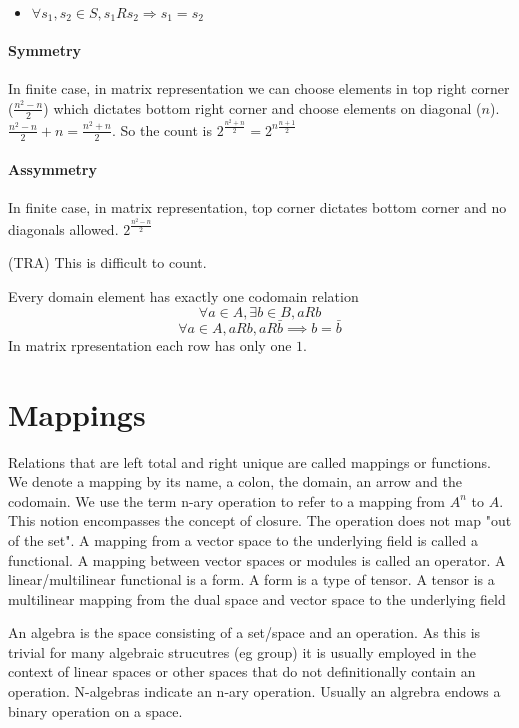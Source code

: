 \documentclass[a4paper]{scrartcl}
\begin{document}
\begin{itemize}
\item{$\forall s_{1},s_{2}\in S, s_{1}Rs_{2} \Rightarrow s_{1} = s_{2}$}

\end{itemize}


\paragraph{Symmetry} In finite case, in matrix representation we can choose elements in top right corner ($\frac{n^2 - n}{2}$) which dictates bottom right corner and choose elements on diagonal ($n$). $\frac{n^2 - n}{2} + n = \frac{n^2 + n}{2}$. So the count is $2^{\frac{n^2 + n}{2}}=2^{n\frac{n+1}{2}}$ 
\paragraph{Assymmetry} In finite case, in matrix representation, top corner dictates bottom corner and no diagonals allowed. $2^{\frac{n^2 - n}{2}}$



(TRA) This is difficult to count.


Every domain element has exactly one codomain relation
$$\forall a\in A, \exists b\in B, aRb$$
$$\forall a\in A, aRb, aR\bar{b} \implies b = \bar{b}$$
In matrix rpresentation each row has only one $1$.

\section{Mappings}
Relations that are left total and right unique are called mappings or functions.
We denote a mapping by its name, a colon, the domain, an arrow and the codomain.
We use the term n-ary operation to refer to a mapping from $A^{n}$ to $A$. This notion encompasses the concept of closure. The operation does not map "out of the set". 
A mapping from a vector space to the underlying field is called a functional. A mapping between vector spaces or modules is called an operator. A linear/multilinear functional is a form. A form is a type of tensor. A tensor is a multilinear mapping from the dual space and vector space to the underlying field
 
An algebra is the space consisting of a set/space and an operation. As this is trivial for many algebraic strucutres (eg group) it is usually employed in the context of linear spaces or other spaces that do not definitionally contain an operation. N-algebras indicate an n-ary operation. Usually an algrebra endows a binary operation on a space. 
\end{document}
